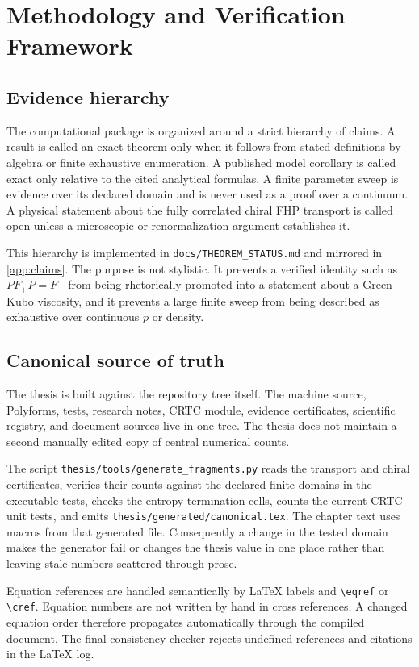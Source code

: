 \chapter{Methodology and Verification Framework}\label{ch:methodology}

\section{Evidence hierarchy}
The computational package is organized around a strict hierarchy of claims. A result is called an exact theorem only when it follows from stated definitions by algebra or finite exhaustive enumeration. A published model corollary is called exact only relative to the cited analytical formulas. A finite parameter sweep is evidence over its declared domain and is never used as a proof over a continuum. A physical statement about the fully correlated chiral FHP transport is called open unless a microscopic or renormalization argument establishes it.

This hierarchy is implemented in \texttt{docs/THEOREM\_STATUS.md} and mirrored in \cref{app:claims}. The purpose is not stylistic. It prevents a verified identity such as $P F_+ P=F_-$ from being rhetorically promoted into a statement about a Green Kubo viscosity, and it prevents a large finite sweep from being described as exhaustive over continuous $p$ or density.

\section{Canonical source of truth}
The thesis is built against the repository tree itself. The machine source, Polyforms, tests, research notes, CRTC module, evidence certificates, scientific registry, and document sources live in one tree. The thesis does not maintain a second manually edited copy of central numerical counts.

The script \texttt{thesis/tools/generate\_fragments.py} reads the transport and chiral certificates, verifies their counts against the declared finite domains in the executable tests, checks the entropy termination cells, counts the current CRTC unit tests, and emits \texttt{thesis/generated/canonical.tex}. The chapter text uses macros from that generated file. Consequently a change in the tested domain makes the generator fail or changes the thesis value in one place rather than leaving stale numbers scattered through prose.

Equation references are handled semantically by LaTeX labels and \texttt{\textbackslash eqref} or \texttt{\textbackslash cref}. Equation numbers are not written by hand in cross references. A changed equation order therefore propagates automatically through the compiled document. The final consistency checker rejects undefined references and citations in the LaTeX log.

